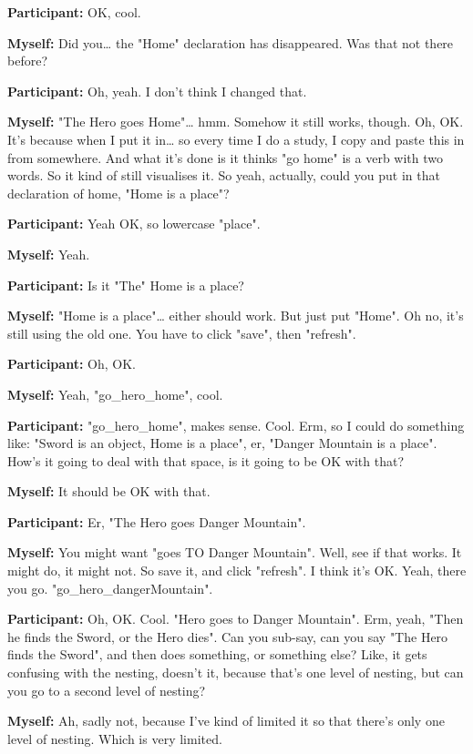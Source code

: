 \documentclass[11pt]{report}
\newcommand{\llabel}[1]{\hypertarget{llineno:#1}{\linelabel{#1}}}
\begin{document}
\begin{linenumbers}
\textbf{Participant:} OK, cool.

\textbf{Myself:} Did you\ldots{} the "Home" declaration has disappeared. Was that not there before?

\textbf{Participant:} Oh, yeah. I don't think I changed that.

\textbf{Myself:} "The Hero goes Home"\ldots{} hmm. Somehow it still works, though. Oh, OK. It's because when I put it in\ldots{} so every time I do a study, I copy and paste this in from somewhere. And what it's done is it thinks "go home" is a verb with two words. So it kind of still visualises it. So yeah, actually, could you put in that declaration of home, "Home is a place"?

\textbf{Participant:} Yeah OK, so lowercase "place".

\textbf{Myself:} Yeah.

\textbf{Participant:} Is it "The" Home is a place?\llabel{lne:syntax3d}

\textbf{Myself:} "Home is a place"\ldots{} either should work. But just put "Home". Oh no, it's still using the old one. You have to click "save", then "refresh".

\textbf{Participant:} Oh, OK.

\textbf{Myself:} Yeah, "go_hero_home", cool.

\textbf{Participant:} "go_hero_home", makes sense.
Cool. Erm, so I could do something like: "Sword is an object, Home is a place",
er, "Danger Mountain is a place". How's it going to deal with that space, is it
going to be OK with that?\llabel{lne:syntax1d}

\textbf{Myself:} It should be OK with that.

\textbf{Participant:} Er, "The Hero goes Danger Mountain".

\textbf{Myself:} You might want "goes TO Danger Mountain". Well, see if that works. It might do, it might not. So save it, and click "refresh". I think it's OK. Yeah, there you go. "go_hero_dangerMountain".

\textbf{Participant:} Oh, OK. Cool. "Hero goes to Danger Mountain". Erm, yeah,
"Then he finds the Sword, or the Hero dies". Can you sub-say, can you say "The
Hero finds the Sword", and then does something, or something else? Like, it gets
confusing with the nesting, doesn't it, because that's one level of nesting, but
can you go to a second level of nesting?\llabel{lne:bug2d}

\textbf{Myself:} Ah, sadly not, because I've kind of limited it so that there's only one level of nesting. Which is very limited.


\end{linenumbers}
\end{document}
